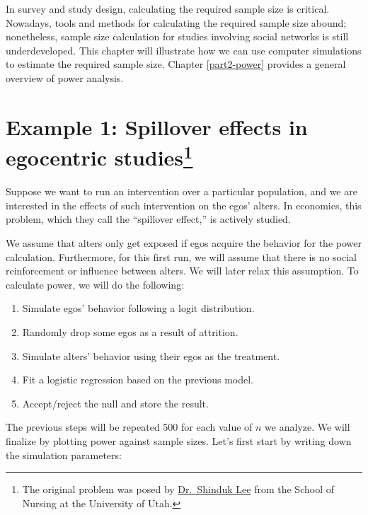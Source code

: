 \documentclass[
]{book}
\begin{document}
In survey and study design, calculating the required sample size is critical. Nowadays, tools and methods for calculating the required sample size abound; nonetheless, sample size calculation for studies involving social networks is still underdeveloped. This chapter will illustrate how we can use computer simulations to estimate the required sample size. Chapter \ref{part2-power} provides a general overview of power analysis.

\hypertarget{example-1-spillover-effects-in-egocentric-studiescredit-ego-power}{%
\section[Example 1: Spillover effects in egocentric studies]{\texorpdfstring{Example 1: Spillover effects in egocentric studies\footnote{The original problem was posed by \href{https://faculty.utah.edu/u6037777-SHINDUK_LEE/hm/index.hml}{Dr.~Shinduk Lee} from the School of Nursing at the University of Utah.}}{Example 1: Spillover effects in egocentric studies}}\label{example-1-spillover-effects-in-egocentric-studiescredit-ego-power}}

Suppose we want to run an intervention over a particular population, and we are interested in the effects of such intervention on the egos' alters. In economics, this problem, which they call the ``spillover effect,'' is actively studied.

We assume that alters only get exposed if egos acquire the behavior for the power calculation. Furthermore, for this first run, we will assume that there is no social reinforcement or influence between alters. We will later relax this assumption. To calculate power, we will do the following:

\begin{enumerate}
\def\labelenumi{\arabic{enumi}.}
\item
  Simulate egos' behavior following a logit distribution.
\item
  Randomly drop some egos as a result of attrition.
\item
  Simulate alters' behavior using their egos as the treatment.
\item
  Fit a logistic regression based on the previous model.
\item
  Accept/reject the null and store the result.
\end{enumerate}

The previous steps will be repeated 500 for each value of \(n\) we analyze. We will finalize by plotting power against sample sizes. Let's first start by writing down the simulation parameters:
\end{document}
